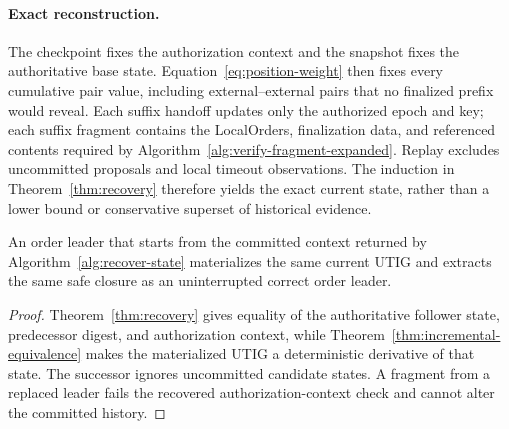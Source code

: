 \paragraph{Exact reconstruction.}
The checkpoint fixes the authorization context and the snapshot fixes the
authoritative base state.  Equation~\eqref{eq:position-weight}
then fixes every cumulative pair value, including external--external pairs
that no finalized prefix would reveal.  Each suffix handoff updates only the
authorized epoch and key; each suffix fragment contains the LocalOrders,
finalization data, and referenced contents required by
Algorithm~\ref{alg:verify-fragment-expanded}.  Replay excludes uncommitted
proposals and local timeout observations.
The induction in Theorem~\ref{thm:recovery} therefore yields the exact current
state, rather than a lower bound or conservative superset of historical
evidence.

\begin{corollary}
\label{cor:handoff-continuity}
An order leader that starts from the committed context returned by
Algorithm~\ref{alg:recover-state} materializes the same current UTIG and
extracts the same safe closure as an uninterrupted correct order leader.
\end{corollary}

\begin{proof}
Theorem~\ref{thm:recovery} gives equality of the authoritative follower state,
predecessor digest, and authorization context, while
Theorem~\ref{thm:incremental-equivalence} makes the materialized UTIG a
deterministic derivative of that state.  The successor ignores uncommitted
candidate states.  A fragment from a replaced leader fails the recovered
authorization-context check and cannot alter the committed history.
\end{proof}
